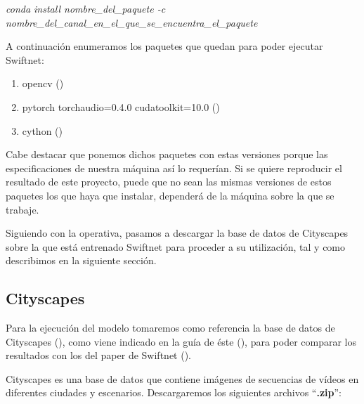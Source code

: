 \begin{center}
\textit{conda install nombre\_del\_paquete -c nombre\_del\_canal\_en\_el\_que\_se\_encuentra\_el\_paquete}
\end{center}

A continuación enumeramos los paquetes que quedan para poder ejecutar Swiftnet:

\begin{enumerate}
\item opencv (\cite{opencv})
\item pytorch torchaudio=0.4.0 cudatoolkit=10.0 (\cite{pytorch})
\item cython (\cite{cython})
\end{enumerate}

Cabe destacar que ponemos dichos paquetes con estas versiones porque las especificaciones de nuestra máquina así lo requerían. Si se quiere reproducir el resultado de este proyecto, puede que no sean las mismas versiones de estos paquetes los que haya que instalar, dependerá de la máquina sobre la que se trabaje.

Siguiendo con la operativa, pasamos a descargar la base de datos de Cityscapes sobre la que está entrenado Swiftnet para proceder a su utilización, tal y como describimos en la siguiente sección.


\subsection{Cityscapes}

Para la ejecución del modelo tomaremos como referencia la base de datos de Cityscapes (\cite{cityscapes}), como viene indicado en la guía de éste (\cite{github_swiftnet}), para poder comparar los resultados con los del paper de Swiftnet (\cite{swiftnet}).

Cityscapes es una base de datos que contiene imágenes de secuencias de vídeos en diferentes ciudades y escenarios. Descargaremos los siguientes archivos ``\textbf{.zip}'':

